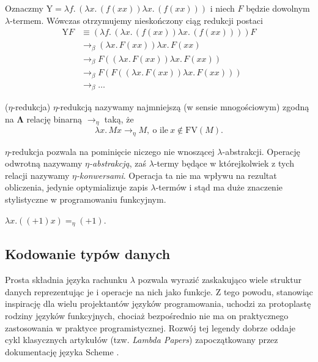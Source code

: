   \begin{przyklad}Oznaczmy \(\mathrm{Y}=\lambda f.\,(\lambda x.\,(f(xx))\lambda x.\,(f(xx)))\) i niech \(F\) będzie dowolnym \(\lambda\)-termem. Wówczas otrzymujemy nieskończony ciąg redukcji postaci
    \begin{align*}
      \mathrm{Y}F &\equiv (\lambda f.\,(\lambda x.\,(f(xx))\lambda x.\,(f(xx))))F\\
                  &\to_\beta (\lambda x.\,F(xx))\lambda x.\,F(xx)\\
                  &\to_\beta F((\lambda x.\,F(xx))\lambda x.\,F(xx))\\
                  &\to_\beta F(F((\lambda x.\,F(xx))\lambda x.\,F(xx)))\\
                  &\to_\beta \dots
    \end{align*}
  \end{przyklad}
\begin{definicja}(\(\eta\)-redukcja)
  \(\eta\)-redukcją nazywamy najmniejszą (w sensie mnogościowym) zgodną na \(\mathbf{\Lambda}\) relację binarną \(\to_\eta\) taką, że
  \[
    \lambda x.\,Mx\to_\eta M,\ \text{o ile}\ x\not\in \mathrm{FV}(M).
  \]

  \(\eta\)-redukcja pozwala na pominięcie niczego nie wnoszącej \(\lambda\)-abstrakcji. Operację odwrotną nazywamy \emph{\(\eta\)-abstrakcją}, zaś \(\lambda\)-termy będące w którejkolwiek z tych relacji nazywamy \emph{\(\eta\)-konwersami}. Operacja ta nie ma wpływu na rezultat obliczenia, jedynie optymializuje zapis \(\lambda\)-termów i stąd ma duże znaczenie stylistyczne w programowaniu funkcyjnym.
  \end{definicja}

  \begin{przyklad}
    \(\lambda x. ((+1) x) =_\eta (+1) \).
  \end{przyklad}

  \subsection{Kodowanie typów danych}
Prosta składnia języka rachunku \(\lambda\) pozwala wyrazić zaskakująco wiele struktur danych reprezentując je i operacje na nich jako funkcje. Z tego powodu, stanowiąc inspirację dla wielu projektantów języków programowania, uchodzi za protoplastę rodziny języków funkcyjnych, chociaż bezpośrednio nie ma on praktycznego zastosowania w praktyce programistycznej. Rozwój tej legendy dobrze oddaje cykl klasycznych artykułów (tzw. \emph{Lambda Papers}) zapoczątkowany przez dokumentację języka Scheme \cite{Sussman:1975:IEL:889230}.

